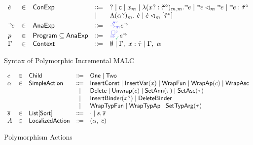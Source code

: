 \begin{figure}[ht]
\[\begin{array}{lcllll}
    \EMV & \in & \EMName & \Coloneqq & 
        \EHole
        \mid \EConst
        \mid \EVar{\VV}{\MV}
        \mid \ELam{\BV}{\NMTV}{\MV}{\MV}{\ELV}
        \mid \EAp{\ELV}{\MV}{\ELV}
        \mid \EAsc{\ELV}{\NMTV}\\
        &&& \mid & \ETLam{\TBV}{\MV}{\EMV} 
        \mid \ETAp{\EMV}{\MV}{\NMTV}\\ 
    \ELV & \in & \ELName & \Coloneqq & \ELow{\NMDV}{\MV}{\EUV}\\ 
    \PV & \in & \PName \subseteq \ELName & \Coloneqq & \ELow{\NV{\DNone}}{\MGood}{\EUV}\\ 
    \ctx & \in & \ctxName & \Coloneqq & 
        \emptyset 
        \mid \extendCtx{\ctx}{\VV}{\MTV}
        \mid \tExtendCtx{\ctx}{\TVV}\\
    \end{array}\]
    \vspace{-10pt}
    \caption{Syntax of Polymorphic Incremental MALC}
    \label{fig:appendix-polymorphism-syntax}
\end{figure}

\begin{figure}[h]
    \[\begin{array}{lclcll}
    c & \in & {\normalfont\textsf{Child}} & \Coloneqq & {\normalfont\textsf{One}} \mid{\normalfont\textsf{Two}} \\
    \alpha & \in & {\normalfont\textsf{SimpleAction}} & \Coloneqq & {\normalfont\textsf{InsertConst}} \mid {\normalfont\textsf{InsertVar}}(x) \mid {\normalfont\textsf{WrapFun}} \mid {\normalfont\textsf{WrapAp}}(c)\mid{\normalfont\textsf{WrapAsc}}\\
        &&&\mid &{\normalfont\textsf{Delete}} \mid {\normalfont\textsf{Unwrap}}(c)\mid {\normalfont\textsf{SetAnn}}(\tau) \mid {\normalfont\textsf{SetAsc}}(\tau)\\
        &&&\mid &{\normalfont\textsf{InsertBinder}}(x?)\mid {\normalfont\textsf{DeleteBinder}}\\
        &&&\mid &{\normalfont\textsf{WrapTypFun}} \mid {\normalfont\textsf{WrapTypAp}} \mid {\normalfont\textsf{SetTypArg}}(\tau)\\
    \overline{s} & \in & \mathsf{List[Sort]} & \Coloneqq & \cdot \mid s,\overline{s}\\ 
    A & \in & {\normalfont\textsf{LocalizedAction}} & \Coloneqq & (\alpha,~\overline{c}) 
    \end{array}\]
    \vspace{-10pt}
    \caption{Polymorphism Actions}
    \label{fig:appendix-polymorphism-actions}
\end{figure}

